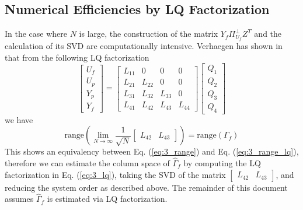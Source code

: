 \subsection{Numerical Efficiencies by LQ Factorization}
In the case where $N$ is large, the construction of the matrix $Y_f\Pi_{U_f}^\perp Z^T$ and the calculation of its SVD are computationally intensive. Verhaegen has shown in \cite{verhaegen1994identification} that from the following LQ factorization
\begin{equation}\label{eq:3_lq}
\begin{bmatrix}U_f\\ U_p\\ Y_p\\ Y_f\end{bmatrix} = 
\begin{bmatrix}
	L_{11} & 0 & 0 & 0\\
	L_{21} & L_{22} & 0 & 0\\
	L_{31} & L_{32} & L_{33} & 0\\
	L_{41} & L_{42} & L_{43} & L_{44}
\end{bmatrix}
\begin{bmatrix}Q_1\\ Q_2\\ Q_3\\ Q_4\end{bmatrix}
\end{equation}
we have
\begin{equation}\label{eq:3_range_lq}
\mbox{range}\left(\lim_{N\rightarrow\infty} \frac{1}{\sqrt{N}} \begin{bmatrix}L_{42} & L_{43}\end{bmatrix}\right) = \mbox{range}\left(\Gamma_f\right)
\end{equation}
This shows an equivalency between Eq. (\ref{eq:3_range}) and Eq. (\ref{eq:3_range_lq}), therefore we can estimate the column space of $\hat{\Gamma}_f$ by computing the LQ factorization in Eq. (\ref{eq:3_lq}), taking the SVD of the matrix $\begin{bmatrix}L_{42} & L_{43}\end{bmatrix}$, and reducing the system order as described above. The remainder of this document assumes $\hat{\Gamma}_f$ is estimated via LQ factorization.









